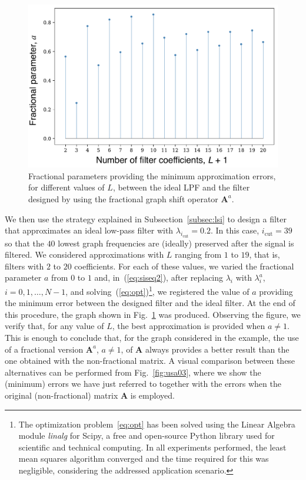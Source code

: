 \begin{figure}[ht!]
	\centering
\includegraphics[width=0.9\linewidth]{Figures/ERROR_ordens_fracionarias.pdf}
	\caption{Fractional parameters providing the minimum approximation errors, for different values of $L$, between the ideal LPF and the filter designed by using the fractional graph shift operator $\mathbf{A}^a$.}%
	\label{fig:usa02}%
\end{figure}

We then use the strategy explained in Subsection~\ref{subsec:lsi} to design a filter that approximates an ideal low-pass filter with $\lambda_{i_\text{cut}}=0.2$. In this case, $i_\text{cut}=39$ so that the $40$ lowest graph frequencies are (ideally) preserved after the signal is filtered. We considered approximations with $L$ ranging from $1$ to $19$, that is, filters with $2$ to $20$ coefficients. For each of these values, we varied the fractional parameter $a$ from $0$ to $1$ and, in~(\ref{eq:siseq2}), after replacing $\lambda_i$ with $\lambda_i^a$, $i=0,1,\ldots,N-1$, and solving~(\ref{eq:opt})\footnote{The optimization problem~\ref{eq:opt} has been solved using the Linear Algebra module \emph{linalg} for Scipy, a free and open-source Python library used for scientific and technical computing. In all experiments performed, the least mean squares algorithm converged and the time required for this was negligible, considering the addressed application scenario.}, we registered the value of $a$ providing the minimum error between the designed filter and the ideal filter. At the end of this procedure, the graph shown in Fig.~\ref{fig:usa02} was produced. Observing the figure, we verify that, for any value of $L$, the best approximation is provided when $a\neq1$. This is enough to conclude that, for the graph considered in the example, the use of a fractional version $\mathbf{A}^a$, $a\neq 1$, of $\mathbf{A}$ always provides a better result than the one obtained with the non-fractional matrix. A visual comparison between these alternatives can be performed from Fig.~\ref{fig:usa03}, where we show the (minimum) errors we have just referred to together with the errors when the original (non-fractional) matrix $\mathbf{A}$ is employed.

